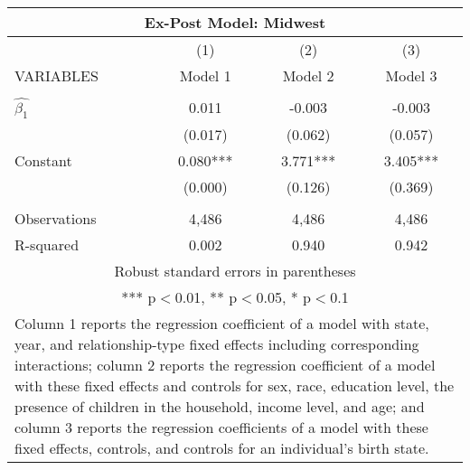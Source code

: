 \begin{tabular}{lccc}
\multicolumn{4}{c}{Ex-Post Model: Midwest} \\ \hline
 & (1) & (2) & (3) \\
VARIABLES & Model 1 & Model 2 & Model 3 \\ \hline
 &  &  &  \\
$\hat{\beta_1}$ & 0.011 & -0.003 & -0.003 \\
 & (0.017) & (0.062) & (0.057) \\
Constant & 0.080*** & 3.771*** & 3.405*** \\
 & (0.000) & (0.126) & (0.369) \\
 &  &  &  \\
Observations & 4,486 & 4,486 & 4,486 \\
 R-squared & 0.002 & 0.940 & 0.942 \\ \hline
\multicolumn{4}{c}{ Robust standard errors in parentheses} \\
\multicolumn{4}{c}{ *** p$<$0.01, ** p$<$0.05, * p$<$0.1} \\
\multicolumn{4}{p{0.8\linewidth}}{\small Column 1 reports the regression coefficient of a model with state, year, and relationship-type fixed effects including corresponding interactions; column 2 reports the regression coefficient of a model with these fixed effects and controls for sex, race, education level, the presence of children in the household, income level, and age; and column 3 reports the regression coefficients of a model with these fixed effects, controls, and controls for an individual’s birth state.} \\
\end{tabular}
